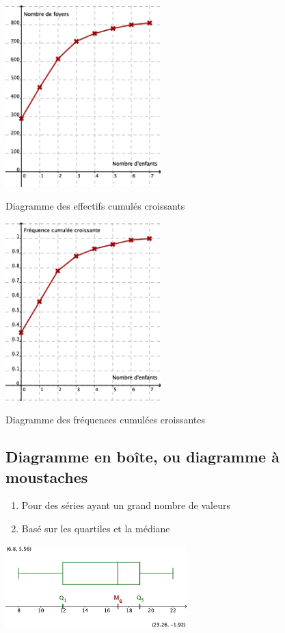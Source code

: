 \begin{multicols}{2}
  \begin{center}
    \includegraphics[width=6cm]{Stats_Fig4_DiagEffCum.png}
    
    Diagramme des effectifs cumulés croissants    
  \end{center}

  \columnbreak
  \begin{center}
    \includegraphics[width=6cm]{Stats_Fig4_DiagFreqCum.png}

    Diagramme des fréquences cumulées croissantes
  \end{center}
\end{multicols}



\subsection{Diagramme en boîte, ou diagramme à moustaches}

\begin{enumerate}
\item Pour des séries ayant un grand nombre de valeurs
\item Basé sur les quartiles et la médiane
\end{enumerate}

\begin{center}
  \includegraphics[width=7cm]{Stats_Fig4_DiagBoite.png}  
\end{center}

